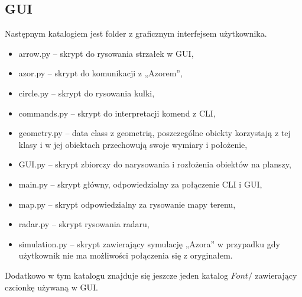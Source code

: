     \subsection{GUI}
        \tab Następnym katalogiem jest folder z graficznym interfejsem użytkownika.
        \begin{itemize}
            \item arrow.py      -- skrypt do rysowania strzałek w GUI,
            \item azor.py       -- skrypt do komunikacji z „Azorem”,
            \item circle.py     -- skrypt do rysowania kulki,
            \item commands.py   -- skrypt do interpretacji komend z CLI,
            \item geometry.py   -- data class z geometrią, poszczególne obiekty korzystają z  tej klasy i w jej obiektach przechowują swoje wymiary i położenie,
            \item GUI.py        -- skrypt zbiorczy do narysowania i rozłożenia obiektów na planszy,
            \item main.py       -- skrypt główny, odpowiedzialny za połączenie CLI i GUI,
            \item map.py        -- skrypt odpowiedzialny za rysowanie mapy terenu,
            \item radar.py      -- skrypt rysowania radaru,
            \item simulation.py -- skrypt zawierający symulację „Azora” w przypadku gdy użytkownik nie ma możliwości połączenia się z oryginałem.
        \end{itemize}
% 
        Dodatkowo w tym katalogu znajduje się jeszcze jeden katalog $Font/$ zawierający czcionkę używaną w GUI.


